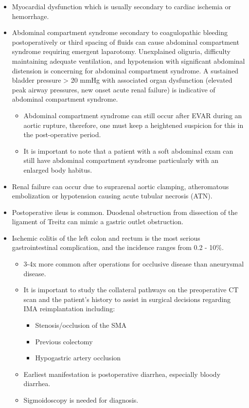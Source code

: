\documentclass[
]{book}
\begin{document}
\begin{itemize}
\item
  Myocardial dysfunction which is usually secondary to cardiac
  ischemia or hemorrhage.
\item
  Abdominal compartment syndrome secondary to coagulopathic bleeding
  postoperatively or third spacing of fluids can cause abdominal
  compartment syndrome requiring emergent laparotomy. Unexplained
  oliguria, difficulty maintaining adequate ventilation, and
  hypotension with significant abdominal distension is concerning for
  abdominal compartment syndrome. A sustained bladder pressure \textgreater{} 20
  mmHg with associated organ dysfunction (elevated peak airway
  pressures, new onset acute renal failure) is indicative of abdominal
  compartment syndrome.

  \begin{itemize}
  \item
    Abdominal compartment syndrome can still occur after EVAR during
    an aortic rupture, therefore, one must keep a heightened
    suspicion for this in the post-operative period.
  \item
    It is important to note that a patient with a soft abdominal
    exam can still have abdominal compartment syndrome particularly
    with an enlarged body habitus.
  \end{itemize}
\item
  Renal failure can occur due to suprarenal aortic clamping,
  atheromatous embolization or hypotension causing acute tubular
  necrosis (ATN).
\item
  Postoperative ileus is common. Duodenal obstruction from dissection
  of the ligament of Treitz can mimic a gastric outlet obstruction.
\item
  Ischemic colitis of the left colon and rectum is the most serious
  gastrointestinal complication, and the incidence ranges from 0.2 -
  10\%.

  \begin{itemize}
  \item
    3-4x more common after operations for occlusive disease than
    aneurysmal disease.
  \item
    It is important to study the collateral pathways on the
    preoperative CT scan and the patient's history to assist in
    surgical decisions regarding IMA reimplantation including:

    \begin{itemize}
    \item
      Stenosis/occlusion of the SMA
    \item
      Previous colectomy
    \item
      Hypogastric artery occlusion
    \end{itemize}
  \item
    Earliest manifestation is postoperative diarrhea, especially
    bloody diarrhea.
  \item
    Sigmoidoscopy is needed for diagnosis.


\end{itemize}
\end{itemize}
\end{document}

